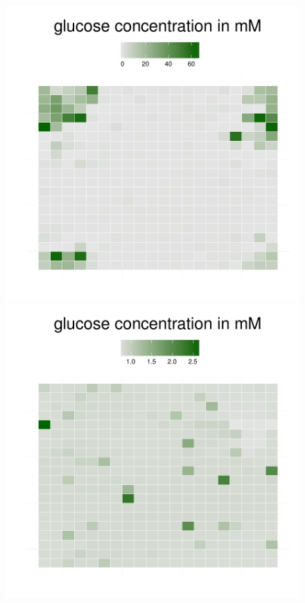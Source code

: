 \begin{figure}[h!]
{\begin{minipage}[t]{0.3\textwidth}
  \end{minipage}
  \begin{minipage}[t]{0.3\textwidth}
    \includegraphics[width=\textwidth]{../results/ecoli_20x20_aerob_seed55_gluc35.pdf}
  \end{minipage}
  \begin{minipage}[t]{0.3\textwidth}
    \includegraphics[width=\textwidth]{../results/ecoli_20x20_aerob_seed55_gluc50.pdf}

\end{minipage}}
\end{figure}
